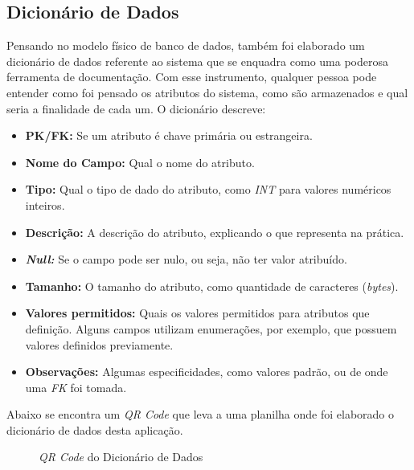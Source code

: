 \subsection{Dicionário de Dados}
Pensando no modelo físico de banco de dados, também foi elaborado um dicionário de dados referente ao sistema que se enquadra como uma poderosa ferramenta de documentação. Com esse instrumento, qualquer pessoa pode entender como foi pensado os atributos do sistema, como são armazenados e qual seria a finalidade de cada um.
O dicionário descreve:
\begin{itemize}
	\item \textbf{PK/FK:} Se um atributo é chave primária ou estrangeira.
	\item \textbf{Nome do Campo:} Qual o nome do atributo.
	\item \textbf{Tipo:} Qual o tipo de dado do atributo, como \textit{INT} para valores numéricos inteiros.
	\item \textbf{Descrição:} A descrição do atributo, explicando o que representa na prática.
	\item \textbf{\textit{Null:}} Se o campo pode ser nulo, ou seja, não ter valor atribuído.
	\item \textbf{Tamanho:} O tamanho do atributo, como quantidade de caracteres (\textit{bytes}).
	\item \textbf{Valores permitidos:} Quais os valores permitidos para atributos que definição. Alguns campos utilizam enumerações, por exemplo, que possuem valores definidos previamente.
	\item \textbf{Observações:} Algumas especificidades, como valores padrão, ou de onde uma \textit{FK} foi tomada.
\end{itemize}
Abaixo se encontra um \textit{QR Code} que leva a uma planilha onde foi elaborado o dicionário de dados desta aplicação.
\begin{figure}[h]
	\centering
	\caption{\emph{QR Code} do Dicionário de Dados}
	\label{fig:qrcode-dicionario-de-dados}
\end{figure}





